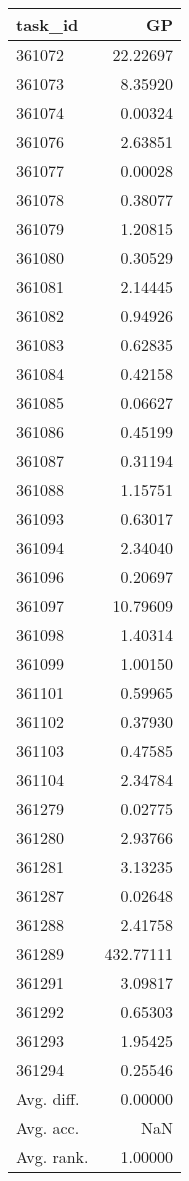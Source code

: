 \begin{tabular}{lr}
\toprule
task\_id & GP \\
\midrule
361072 & 22.22697 \\
361073 & 8.35920 \\
361074 & 0.00324 \\
361076 & 2.63851 \\
361077 & 0.00028 \\
361078 & 0.38077 \\
361079 & 1.20815 \\
361080 & 0.30529 \\
361081 & 2.14445 \\
361082 & 0.94926 \\
361083 & 0.62835 \\
361084 & 0.42158 \\
361085 & 0.06627 \\
361086 & 0.45199 \\
361087 & 0.31194 \\
361088 & 1.15751 \\
361093 & 0.63017 \\
361094 & 2.34040 \\
361096 & 0.20697 \\
361097 & 10.79609 \\
361098 & 1.40314 \\
361099 & 1.00150 \\
361101 & 0.59965 \\
361102 & 0.37930 \\
361103 & 0.47585 \\
361104 & 2.34784 \\
361279 & 0.02775 \\
361280 & 2.93766 \\
361281 & 3.13235 \\
361287 & 0.02648 \\
361288 & 2.41758 \\
361289 & 432.77111 \\
361291 & 3.09817 \\
361292 & 0.65303 \\
361293 & 1.95425 \\
361294 & 0.25546 \\
Avg. diff. & 0.00000 \\
Avg. acc. & NaN \\
Avg. rank. & 1.00000 \\
\bottomrule
\end{tabular}
